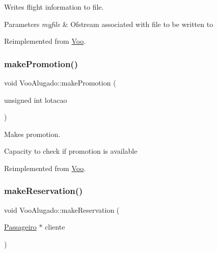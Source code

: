Writes flight information to file. 


\begin{DoxyParams}{Parameters}
{\em myfile} & Ofstream associated with file to be written to \\
\hline
\end{DoxyParams}


Reimplemented from \hyperlink{class_voo_a3268d6d5ac51e31ebbdb11fd637544c1}{Voo}.

\mbox{\label{class_voo_alugado_a0177e4dc4b81737dab75b41d765c2785}} 
\subsubsection{\texorpdfstring{make\+Promotion()}{makePromotion()}}
{\footnotesize\ttfamily void Voo\+Alugado\+::make\+Promotion (\begin{DoxyParamCaption}\item[{unsigned int}]{lotacao }\end{DoxyParamCaption})\hspace{0.3cm}{\ttfamily [virtual]}}



Makes promotion. 

Capacity to check if promotion is available 

Reimplemented from \hyperlink{class_voo_abe4f7816ae9132314e0288e7b8a077d8}{Voo}.

\mbox{\label{class_voo_alugado_a5b146c059f3ffba9a2e2e843d6999d0a}} 
\subsubsection{\texorpdfstring{make\+Reservation()}{makeReservation()}}
{\footnotesize\ttfamily void Voo\+Alugado\+::make\+Reservation (\begin{DoxyParamCaption}\item[{\hyperlink{class_passageiro}{Passageiro} $\ast$}]{cliente }\end{DoxyParamCaption})\hspace{0.3cm}{\ttfamily [virtual]}}



